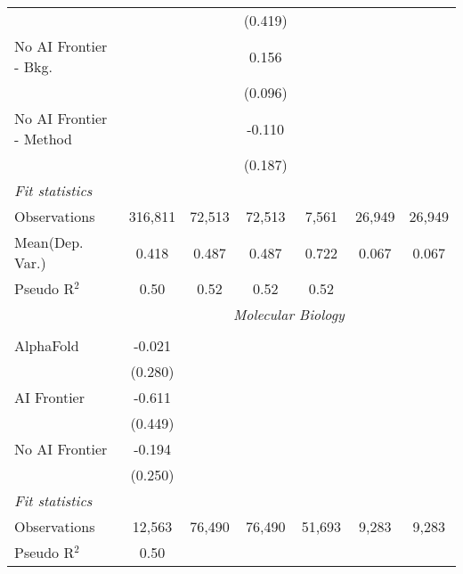 \begin{tabular}{lcccccc}
                           &              &               & (0.419)       &              &        &   \\   
   No AI Frontier - Bkg.   &              &               & 0.156         &              &        &   \\   
                           &              &               & (0.096)       &              &        &   \\   
   No AI Frontier - Method &              &               & -0.110        &              &        &   \\   
                           &              &               & (0.187)       &              &        &   \\   
   \midrule
   \emph{Fit statistics}\\
   Observations            & 316,811      & 72,513        & 72,513        & 7,561        & 26,949 & 26,949\\  
Mean(Dep. Var.) & 0.418 & 0.487 & 0.487 & 0.722 & 0.067 & 0.067 \\
   Pseudo R$^2$            & 0.50         & 0.52          & 0.52          & 0.52         &        & \\  
   
 & \multicolumn{6}{c}{\textit{Molecular Biology}} \\ \\
   AlphaFold      & -0.021   &        &        &        &       &   \\   
                  & (0.280)  &        &        &        &       &   \\   
   AI Frontier    & -0.611   &        &        &        &       &   \\   
                  & (0.449)  &        &        &        &       &   \\   
   No AI Frontier & -0.194   &        &        &        &       &   \\   
                  & (0.250)  &        &        &        &       &   \\   
   \midrule
   \emph{Fit statistics}\\
   Observations   & 12,563   & 76,490 & 76,490 & 51,693 & 9,283 & 9,283\\  
   Pseudo R$^2$   & 0.50     &        &        &        &       & \\  
   

\end{tabular}
